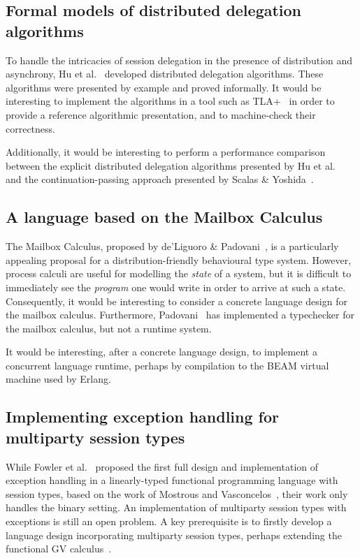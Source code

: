 \documentclass[
graybox,
envcountchap
]{svmult}
\begin{document}
\begin{bibunit}
  \subsection{Formal models of distributed delegation algorithms}
  To handle the intricacies of session delegation in the presence of
  distribution and asynchrony, Hu et al.~\cite{HuYH08:session-java} developed
  distributed delegation algorithms. These algorithms were presented by example
  and proved informally. It would be interesting to implement the algorithms in
  a tool such as TLA+~\cite{Lamport2002:tlaplus} in order to provide a reference
  algorithmic presentation, and to machine-check their correctness.

  Additionally, it would be interesting to perform a performance comparison
  between the explicit distributed delegation algorithms presented by Hu et
  al.~\cite{HuYH08:session-java} and the continuation-passing approach presented
  by Scalas \& Yoshida~\cite{ScalasY16:session-scala}.

  \subsection{A language based on the Mailbox Calculus}
  The Mailbox Calculus, proposed by de'Liguoro \&
  Padovani~\cite{deLiguoroP18:mailbox}, is a particularly
  appealing proposal for a distribution-friendly behavioural type system.
  However, process calculi are useful for modelling the \emph{state} of a
  system, but it is difficult to immediately see the \emph{program} one would
  write in order to arrive at such a state. Consequently, it would be
  interesting to consider a concrete language design for the mailbox calculus.
  Furthermore, Padovani~\cite{Padovani18:mc2} has implemented a typechecker for
  the mailbox calculus, but not a runtime system.

  It would be interesting, after a concrete language design, to implement a
  concurrent language runtime, perhaps by compilation to the BEAM virtual
  machine used by Erlang.

  \subsection{Implementing exception handling for multiparty session types}
  While Fowler et al.~\cite{FowlerLMD19:stwt} proposed the first full design and
  implementation of exception handling in a linearly-typed functional
  programming language with session types, based on the work of Mostrous and
  Vasconcelos~\cite{MostrousV18:affine}, their work only handles the binary setting. An
  implementation of multiparty session types with exceptions is still an open
  problem. A key prerequisite is to firstly develop a language design
  incorporating multiparty session types, perhaps extending the functional GV
  calculus~\cite{Wadler14:prop-sessions,LindleyM15:semantics}.


\end{bibunit}
\end{document}
